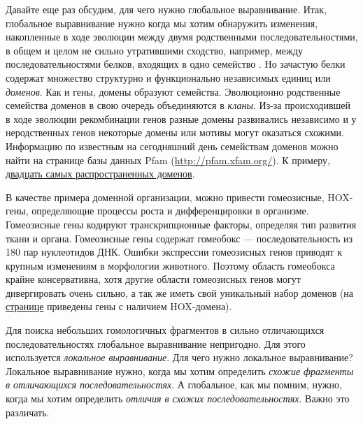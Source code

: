 \documentclass[letterpaper, 11pt]{article}
\begin{document}
Давайте еще раз обсудим, для чего нужно глобальное выравнивание. Итак, глобальное выравнивание нужно когда мы хотим обнаружить изменения, накопленные в ходе эволюции между двумя родственными последовательностями, в общем и целом не сильно утратившими сходство, например, между последовательностями белков, входящих в одно семейство
.
Но зачастую белки содержат множество структурно и функционально независимых единиц или \textit{доменов}. Как и гены, домены образуют семейства. Эволюционно родственные семейства доменов в свою очередь объединяются в \textit{кланы}. Из-за происходившей в ходе эволюции рекомбинации генов разные домены развивались независимо и у неродственных генов некоторые домены или мотивы могут оказаться схожими. Информацию по известным на сегодняшний день семействам доменов можно найти на странице базы данных Pfam (\url{http://pfam.xfam.org/}). К примеру, \href{http://pfam.xfam.org/family/browse?browse=top%20twenty}{двадцать самых распространенных доменов}.

В качестве примера доменной организации, можно привести гомеозисные, HOX-гены, определяющие процессы роста и дифференцировки в организме. Гомеозисные гены кодируют транскрипционные факторы, определяя тип развития ткани и органа. Гомеозисные гены содержат гомеобокс — последовательность из 180 пар нуклеотидов ДНК. Ошибки экспрессии гомеозисных генов приводят к крупным изменениям в морфологии животного. Поэтому область гомеобокса крайне консервативна, хотя другие области гомеозисных генов могут дивергировать очень сильно, а так же иметь свой уникальный набор доменов (на \href{http://pfam.xfam.org/family/PF05920#tabview=tab1}{странице} приведены гены с наличием HOX-домена).

Для поиска небольших гомологичных фрагментов в сильно отличающихся последовательностях глобальное выравнивание непригодно. Для этого используется \textit{локальное выравнивание}. Для чего нужно локальное выравнивание? Локальное выравнивание нужно, когда мы хотим определить \textit{схожие фрагменты в отличающихся последовательностях}. А глобальное, как мы помним, нужно, когда мы хотим определить \textit{отличия в схожих последовательностях}. Важно это различать.
\end{document}
